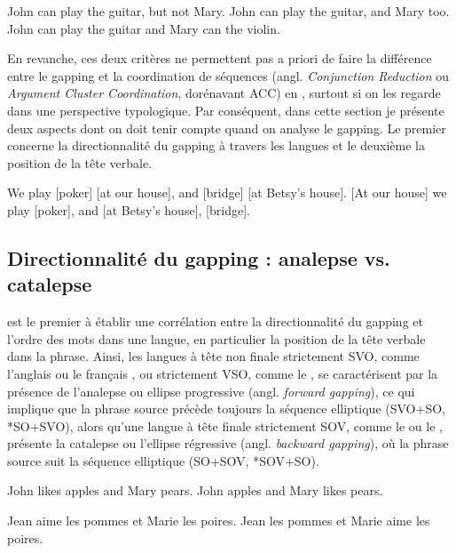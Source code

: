 \ea 
\ea  John can play the guitar, but not Mary. \label{ch2:ex2a}  
\ex  John can play the guitar, and Mary too. \label{ch2:ex2b}
\ex  John can play the guitar and Mary can the violin. \label{ch2:ex2c}  
\z
\z

En revanche, ces deux critères ne permettent pas a priori de faire la différence entre le gapping et la coordination de séquences (angl. \textit{Conjunction Reduction} ou \textit{Argument Cluster Coordination}, dorénavant ACC) en , surtout si on les regarde dans une perspective typologique. Par conséquent, dans cette section je présente deux aspects dont on doit tenir compte quand on analyse le gapping. Le premier concerne la directionnalité du gapping à travers les langues et le deuxième la position de la tête verbale.


\ea \label{ch2:ex3}
\ea  We play [poker] [at our house], and [bridge] [at Betsy’s house]. 
\ex {} [At our house] we play [poker], and [at Betsy’s house], [bridge].
\z
\z

\subsection{Directionnalité du gapping : analepse vs. catalepse} \label{ch2:sect2.2.1}

\citet{Ross1970} est le premier à établir une corrélation entre la directionnalité du gapping et l’ordre des mots dans une langue, en particulier la position de la tête verbale dans la phrase. Ainsi, les langues à tête non finale strictement SVO, comme l’anglais  ou le français , ou strictement VSO, comme le  , se caractérisent par la présence de l’analepse ou ellipse progressive (angl. \textit{forward gapping}), ce qui implique que la phrase source précède toujours la séquence elliptique (SVO+SO, *SO+SVO), alors qu’une langue à tête finale strictement SOV, comme le   ou le , présente la catalepse ou l'ellipse régressive (angl. \textit{backward gapping}), où la phrase source suit la séquence elliptique (SO+SOV, *SOV+SO). 

\ea \label{ch2:ex4}
\ea John likes apples and Mary pears.
\ex *John apples and Mary likes pears.
\z
\z

\ea \label{ch2:ex5}
\ea Jean aime les pommes et Marie les poires.
\ex *Jean les pommes et Marie aime les poires.
\z
\z

